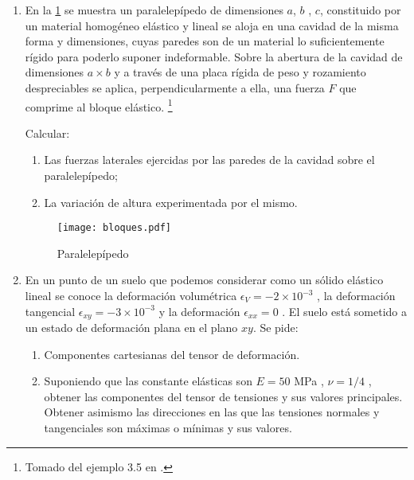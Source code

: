 \documentclass[../notas medios.tex]{subfiles}
\begin{document}
\begin{enumerate}
\newpage
\item \label{punto05_m} En la  \cref{bloques} se muestra un paralelepípedo de dimensiones $a$, $b$ , $c$, constituido por un material homogéneo elástico y lineal se aloja en una cavidad de la misma forma y dimensiones, cuyas paredes son de un material lo suficientemente rígido para poderlo suponer indeformable.
Sobre la abertura de la cavidad de dimensiones $a\times b$ y a través de una placa rígida de peso y rozamiento despreciables se aplica, perpendicularmente a ella, una fuerza $F$ que comprime al bloque elástico. \footnote{Tomado del ejemplo 3.5 en \cite{book:problemas_resueltos}.}

Calcular:
\begin{enumerate}
\item Las fuerzas laterales ejercidas por las paredes de la cavidad sobre el paralelepípedo;
\item La variación de altura experimentada por el mismo.
\end{enumerate}

\begin{figure}[h]
	\centering
	\texttt{[image: bloques.pdf]} 
	\caption{Paralelepípedo}
	\label{bloques}
\end{figure}

\item \label{punto06_m} En un punto de un suelo que podemos considerar como un sólido elástico lineal se conoce la deformación volumétrica $\epsilon_V = -2\times10^{-3}$ , la deformación tangencial $\epsilon_{xy} = - 3 \times 10^{-3}$ y la deformación  $\epsilon_{xx} = 0$ . El suelo está sometido a un estado de deformación plana en el plano $x y$. Se pide:
\begin{enumerate}
\item Componentes cartesianas del tensor de deformación. 
\item  Suponiendo que las constante elásticas son $E = 50$ MPa , $\nu =1/4$ , obtener las componentes del tensor de tensiones y sus valores principales. Obtener asimismo las direcciones en las que las tensiones normales y tangenciales son máximas o mínimas y sus valores.
\end{enumerate}


\end{enumerate}
\end{document}
